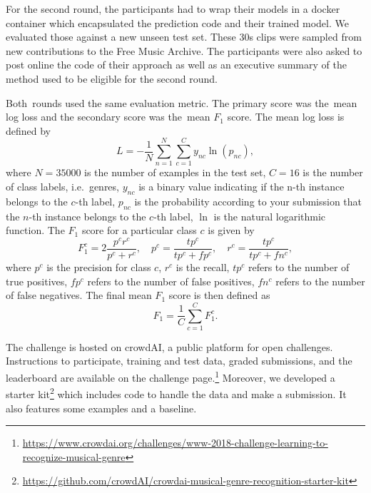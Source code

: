 \documentclass[sigconf]{acmart}
\begin{document}
For the second round, the participants had to wrap their models in a docker container which encapsulated the prediction code and their trained model.
We evaluated those against a new unseen test set. These 30s clips were sampled from new contributions to the Free Music Archive.
The participants were also asked to post online the code of their approach as well as an executive summary of the method used to be eligible for the second round.

Both rounds used the same evaluation metric. The primary score was the mean log loss and the secondary score was the mean $F_1$ score.
The mean log loss is defined by
\begin{equation}
	L = - \frac{1}{N} \sum_{n=1}^N \sum_{c=1}^{C} y_{nc} \ln(p_{nc}),
\end{equation}
where $N=35000$ is the number of examples in the test set,
$C=16$ is the number of class labels, i.e.\ genres,
$y_{nc}$ is a binary value indicating if the n-th instance belongs to the $c$-th label,
$p_{nc}$ is the probability according to your submission that the $n$-th instance belongs to the $c$-th label,
$\ln$ is the natural logarithmic function.
The $F_1$ score for a particular class $c$ is given by
\begin{equation}
	F_1^c = 2\frac{p^c r^c}{p^c + r^c}, \hspace{1em}
	p^c = \frac{tp^c}{tp^c + fp^c}, \hspace{1em}
	r^c = \frac{tp^c}{tp^c + fn^c},
\end{equation}
where
$p^c$ is the precision for class $c$,
$r^c$ is the recall,
$tp^c$ refers to the number of true positives,
$fp^c$ refers to the number of false positives,
$fn^c$ refers to the number of false negatives.
The final mean $F_1$ score is then defined as
\begin{equation}
	F_1 = \frac{1}{C} \sum_{c=1}^{C} F_1^c.
\end{equation}

The challenge is hosted on crowdAI, a public platform for open challenges. Instructions to participate, training and test data, graded submissions, and the leaderboard are available on the challenge page.\footnote{\url{https://www.crowdai.org/challenges/www-2018-challenge-learning-to-recognize-musical-genre}}
Moreover, we developed a starter kit\footnote{\url{https://github.com/crowdAI/crowdai-musical-genre-recognition-starter-kit}} which includes code to handle the data and make a submission. It also features some examples and a baseline.
\end{document}
